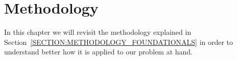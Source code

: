 

\chapter{Methodology}

In this chapter we will revisit the methodology explained in Section~\ref{SECTION:METHODOLOGY_FOUNDATIONALS} in order to understand better how it is applied to our problem at hand.


